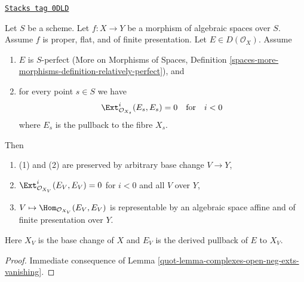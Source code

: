 \begin{lemma}[Complexes]
\label{quot-lemma-complexes}
\href{https://stacks.math.columbia.edu/tag/0DLD}{\texttt{Stacks tag 0DLD}}

Let $S$ be a scheme. Let $f : X \to Y$ be a morphism of algebraic
spaces over $S$. Assume $f$ is proper, flat, and of finite presentation.
Let $E \in D(\mathcal{O}_X)$.
Assume
\begin{enumerate}
\item $E$ is $S$-perfect (More on Morphisms of Spaces, Definition
\ref{spaces-more-morphisms-definition-relatively-perfect}), and
\item for every point $s \in S$ we have
$$
\Ext^i_{\mathcal{O}_{X_s}}(E_s, E_s) = 0
\quad\text{for}\quad i < 0
$$
where $E_s$ is the pullback to the fibre $X_s$.
\end{enumerate}
Then
\begin{enumerate}
\item[(a)] (1) and (2) are preserved by arbitrary base change $V \to Y$,
\item[(b)] $\Ext^i_{\mathcal{O}_{X_V}}(E_V, E_V) = 0$ for $i < 0$
and all $V$ over $Y$,
\item[(c)] $V \mapsto \Hom_{\mathcal{O}_{X_V}}(E_V, E_V)$ is representable
by an algebraic space affine and of finite presentation over $Y$.
\end{enumerate}
Here $X_V$ is the base change of $X$ and $E_V$ is the derived pullback
of $E$ to $X_V$.
\end{lemma}

\begin{proof}

Immediate consequence of Lemma \ref{quot-lemma-complexes-open-neg-exts-vanishing}.
\end{proof}

